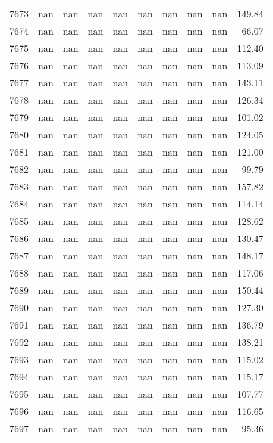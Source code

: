 \begin{tabular}{lrrrrrrrrr}
7673 & nan & nan & nan & nan & nan & nan & nan & nan & 149.84 \\
7674 & nan & nan & nan & nan & nan & nan & nan & nan & 66.07 \\
7675 & nan & nan & nan & nan & nan & nan & nan & nan & 112.40 \\
7676 & nan & nan & nan & nan & nan & nan & nan & nan & 113.09 \\
7677 & nan & nan & nan & nan & nan & nan & nan & nan & 143.11 \\
7678 & nan & nan & nan & nan & nan & nan & nan & nan & 126.34 \\
7679 & nan & nan & nan & nan & nan & nan & nan & nan & 101.02 \\
7680 & nan & nan & nan & nan & nan & nan & nan & nan & 124.05 \\
7681 & nan & nan & nan & nan & nan & nan & nan & nan & 121.00 \\
7682 & nan & nan & nan & nan & nan & nan & nan & nan & 99.79 \\
7683 & nan & nan & nan & nan & nan & nan & nan & nan & 157.82 \\
7684 & nan & nan & nan & nan & nan & nan & nan & nan & 114.14 \\
7685 & nan & nan & nan & nan & nan & nan & nan & nan & 128.62 \\
7686 & nan & nan & nan & nan & nan & nan & nan & nan & 130.47 \\
7687 & nan & nan & nan & nan & nan & nan & nan & nan & 148.17 \\
7688 & nan & nan & nan & nan & nan & nan & nan & nan & 117.06 \\
7689 & nan & nan & nan & nan & nan & nan & nan & nan & 150.44 \\
7690 & nan & nan & nan & nan & nan & nan & nan & nan & 127.30 \\
7691 & nan & nan & nan & nan & nan & nan & nan & nan & 136.79 \\
7692 & nan & nan & nan & nan & nan & nan & nan & nan & 138.21 \\
7693 & nan & nan & nan & nan & nan & nan & nan & nan & 115.02 \\
7694 & nan & nan & nan & nan & nan & nan & nan & nan & 115.17 \\
7695 & nan & nan & nan & nan & nan & nan & nan & nan & 107.77 \\
7696 & nan & nan & nan & nan & nan & nan & nan & nan & 116.65 \\
7697 & nan & nan & nan & nan & nan & nan & nan & nan & 95.36 \\

\end{tabular}
